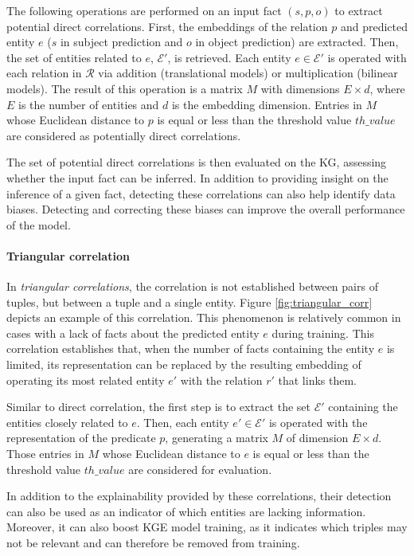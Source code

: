 The following operations are performed on an input fact $(s,p,o)$ to extract potential direct correlations. First, the embeddings of the relation $p$ and predicted entity $e$ ($s$ in subject prediction and $o$ in object prediction) are extracted. Then, the set of entities related to $e$, $\mathcal{E}'$, is retrieved. Each entity $e \in \mathcal{E}'$ is operated with each relation in $\mathcal{R}$ via addition (translational models) or multiplication (bilinear models). The result of this operation is a matrix $M$ with dimensions $E \times d$, where $E$ is the number of entities and $d$ is the embedding dimension. Entries in $M$ whose Euclidean distance to $p$ is equal or less than the threshold value $th\_value$ are considered as potentially direct correlations. 

The set of potential direct correlations is then evaluated on the KG, assessing whether the input fact can be inferred. In addition to providing insight on the inference of a given fact, detecting these correlations can also help identify data biases. Detecting and correcting these biases can improve the overall performance of the model.

\paragraph{Triangular correlation}

In \textit{triangular correlations}, the correlation is not established between pairs of tuples, but between a tuple and a single entity. Figure \ref{fig:triangular_corr} depicts an example of this correlation. This phenomenon is relatively common in cases with a lack of facts about the predicted entity $e$ during training. This correlation establishes that, when the number of facts containing the entity $e$ is limited, its representation can be replaced by the resulting embedding of operating its most related entity $e'$ with the relation $r'$ that links them.

Similar to direct correlation, the first step is to extract the set $\mathcal{E}'$ containing the entities closely related to $e$. Then, each entity $e' \in \mathcal{E}'$ is operated with the representation of the predicate $p$, generating a matrix $M$ of dimension $E \times d$. Those entries in $M$ whose Euclidean distance to $e$ is equal or less than the threshold value $th\_value$ are considered for evaluation.

In addition to the explainability provided by these correlations, their detection can also be used as an indicator of which entities are lacking information. Moreover, it can also boost KGE model training, as it indicates which triples may not be relevant and can therefore be removed from training. 

